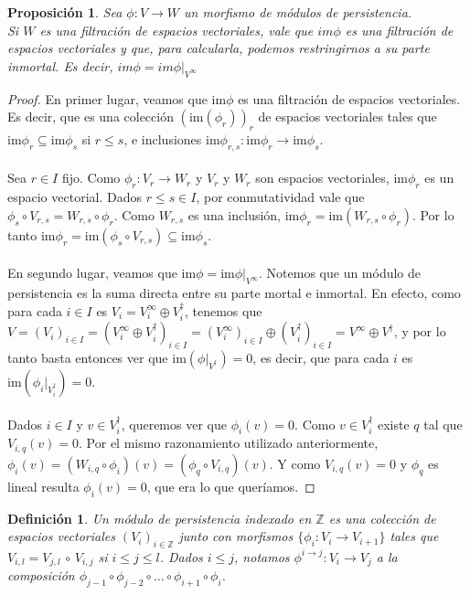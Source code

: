 \documentclass[12pt,a4paper]{article}
\newtheorem{proposition}[theorem]{Proposición}
\newtheorem{definition}[theorem]{Definición}
\begin{document}
\begin{proposition}
    Sea $\phi:V \rightarrow W$ un morfismo de módulos de persistencia.
    \\
    Si $W$ es una filtración de espacios vectoriales, vale que $im\phi$ es una filtración de espacios vectoriales y que, para calcularla, podemos restringirnos a su parte inmortal. Es decir, $im\phi = im\phi|_{V^\infty}$
\end{proposition}
\begin{proof}
    En primer lugar, veamos que $\text{im}\phi$ es una filtración de espacios vectoriales. Es decir, que es una colección $(\text{im} (\phi_r))_r$ de espacios vectoriales tales que $\text{im}\phi_r \subseteq \text{im}\phi_s$ si $r \leq s$, e inclusiones $\text{im}\phi_{r,s}: \text{im}\phi_r \rightarrow \text{im}\phi_s$.
    \\
    \\
    Sea $r \in I$ fijo. Como $\phi_r: V_r \rightarrow W_r$ y $V_r$ y $W_r$ son espacios vectoriales, $\text{im}\phi_r$ es un espacio vectorial. Dados $r \leq s \in I$, por conmutatividad vale que $\phi_s \circ V_{r,s} = W_{r,s} \circ \phi_r$. Como $W_{r,s}$ es una inclusión, $\text{im}\phi_r = \text{im}(W_{r,s} \circ \phi_r)$. Por lo tanto $\text{im}\phi_r = \text{im} (\phi_s \circ V_{r,s}) \subseteq \text{im}\phi_s$.
    \\
    \\
    En segundo lugar, veamos que $\text{im} \phi = \text{im}\phi|_{V^\infty}$. Notemos que un módulo de persistencia es la suma directa entre su parte mortal e inmortal. En efecto, como para cada $i \in I$ es $V_i = V^\infty_i \oplus V^\dagger_i$, tenemos que $V = (V_i)_{i \in I} = (V^\infty_i \oplus V^\dagger_i)_{i \in I} = (V^\infty_i)_{i \in I} \oplus (V^\dagger_i)_{i \in I} = V^\infty \oplus V^\dagger$, y por lo tanto basta entonces ver que $\text{im} (\phi|_{V^\dagger}) = 0$,  es decir, que para cada $i$ es $\text{im} (\phi_i|_{V_i^\dagger}) = 0$.
    \\
    \\
    Dados $i \in I$ y $v \in V_i^\dagger$, queremos ver que $\phi_i(v) = 0$. Como $v \in V_i^\dagger$ existe $q$ tal que $V_{i,q}(v) = 0$. Por el mismo razonamiento utilizado anteriormente, $\phi_i(v) = (W_{i,q} \circ \phi_i)(v) = (\phi_q \circ V_{i,q})(v)$. Y como $V_{i,q}(v) = 0$ y $\phi_q$ es lineal resulta $\phi_i(v) = 0$, que era lo que queríamos.
\end{proof}
\begin{definition}
    Un módulo de persistencia indexado en $\mathbb{Z}$ es una colección de espacios vectoriales $(V_i)_{i \in \mathbb{Z}}$ junto con morfismos $\{ \phi_i : V_i \rightarrow V_{i+1} \}$ tales que $V_{i,l} = V_{j,l} \, \circ \, V_{i,j}$ si $i \leq j \leq l$.
    Dados $i \leq j$, notamos $\phi^{i \rightarrow j}: V_i \rightarrow V_j$ a la composición $\phi_{j-1} \circ \phi_{j-2} \circ \dots \circ \phi_{i+1} \circ \phi_{i}$.
\end{definition}
\end{document}
